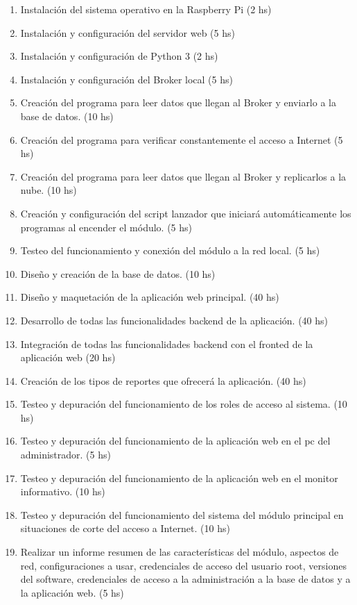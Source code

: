 \documentclass[11pt]{charter}
\begin{document}
\begin{enumerate}
\begin{enumerate}
	\item Instalación del sistema operativo en la Raspberry Pi (2 hs)
	\item Instalación y configuración del servidor web (5 hs)
	\item Instalación y configuración de Python 3 (2 hs)
	\item Instalación y configuración del Broker local (5 hs)
	\item Creación del programa para leer datos que llegan al Broker y enviarlo a la base de datos. (10 hs)
	\item Creación del programa para verificar constantemente el acceso a Internet (5 hs)
	\item Creación del programa para leer datos que llegan al Broker y replicarlos a la nube. (10 hs)
	\item Creación y configuración del script lanzador que iniciará automáticamente los programas al encender el módulo. (5 hs)
	\item Testeo del funcionamiento y conexión del módulo a la red local. (5 hs)
	\item Diseño y creación de la base de datos. (10 hs)
	\item Diseño y maquetación de la aplicación web principal. (40 hs)
	\item Desarrollo de todas las funcionalidades backend de la aplicación. (40 hs)
	\item Integración de todas las funcionalidades backend con el fronted de la aplicación web (20 hs)
	\item Creación de los tipos de reportes que ofrecerá la aplicación. (40 hs)
	\item Testeo y depuración del funcionamiento de los roles de acceso al sistema. (10 hs)
	\item Testeo y depuración del funcionamiento de la aplicación web en el pc del administrador. (5 hs)
	\item Testeo y depuración del funcionamiento de la aplicación web en el monitor informativo. (10 hs)
	\item Testeo y depuración del funcionamiento del sistema del módulo principal en situaciones de corte del acceso a Internet. (10 hs) 
	\item Realizar un informe resumen de las características del módulo, aspectos de red, configuraciones a usar, credenciales de acceso del usuario root, versiones del software, credenciales de acceso a la administración a la base de datos y a la aplicación web. (5 hs)
	\end{enumerate}

\end{enumerate}
\end{document}
